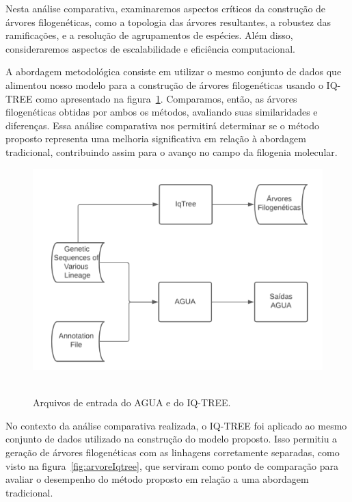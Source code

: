 Nesta análise comparativa, examinaremos aspectos críticos da construção de árvores filogenéticas, como a topologia das árvores resultantes, a robustez das ramificações, e a resolução de agrupamentos de espécies. Além disso, consideraremos aspectos de escalabilidade e eficiência computacional.

A abordagem metodológica consiste em utilizar o mesmo conjunto de dados que alimentou nosso modelo para a construção de árvores filogenéticas usando o IQ-TREE como apresentado na figura~\ref{fig:inputAguaIqtree}. Comparamos, então, as árvores filogenéticas obtidas por ambos os métodos, avaliando suas similaridades e diferenças. Essa análise comparativa nos permitirá determinar se o método proposto representa uma melhoria significativa em relação à abordagem tradicional, contribuindo assim para o avanço no campo da filogenia molecular.

\begin{figure}[htb]
  \centering
  \caption{Arquivos de entrada do AGUA e do IQ-TREE.}
  \includegraphics[scale=0.45]{figuras/pipelines/agua_iqtree.png}
  ~\label{fig:inputAguaIqtree}
\end{figure}

No contexto da análise comparativa realizada, o IQ-TREE foi aplicado ao mesmo conjunto de dados utilizado na construção do modelo proposto. Isso permitiu a geração de árvores filogenéticas com as linhagens corretamente separadas, como visto na figura~\ref{fig:arvoreIqtree}, que serviram como ponto de comparação para avaliar o desempenho do método proposto em relação a uma abordagem tradicional.

